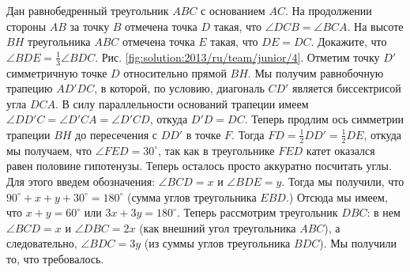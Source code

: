 \problem{}
Дан равнобедренный треугольник $ABC$ с основанием $AC$.
На продолжении стороны $AB$ за точку $B$ отмечена точка $D$ такая, что
$\angle DCB = \angle BCA$.
На высоте $BH$ треугольника $ABC$ отмечена точка $E$ такая, что $DE = DC$.
Докажите, что $\angle BDE = \frac{1}{3} \angle BDC$. 
%
\label{solution:2013/ru/team/junior/4}
Рис. \ref{fig:solution:2013/ru/team/junior/4}.
Отметим точку $D'$ симметричную точке $D$ относительно прямой $BH$.
Мы получим равнобочную трапецию $AD'DC$, в которой, по условию, диагональ $CD'$
является биссектрисой угла $DCA$.
В силу параллельности оснований трапеции имеем
$\angle D D' C = \angle D' C A = \angle D' C D$, откуда $D'D = DC$.
Теперь продлим ось симметрии трапеции $BH$ до пересечения с $DD'$ в точке $F$.
Тогда $FD = \frac{1}{2} DD' = \frac{1}{2} DE$, откуда мы получаем, что
$\angle FED = 30^\circ$, так как в треугольнике $FED$ катет оказался равен
половине гипотенузы.
Теперь осталось просто аккуратно посчитать углы.
Для этого введем обозначения: $\angle BCD = x$ и $\angle BDE = y$.
Тогда мы получили, что $90^\circ + x + y + 30^\circ = 180^\circ$
(сумма углов треугольника $EBD$.)
Отсюда мы имеем, что $x + y = 60^\circ$ или $3 x + 3 y = 180^\circ$.
Теперь рассмотрим треугольник $DBC$: в нем $\angle BCD = x$ и
$\angle DBC = 2 x$ (как внешний угол треугольника $ABC$), а следовательно,
$\angle BDC = 3 y$ (из суммы углов треугольника $BDC$).
Мы получили то, что требовалось.
\endproblem

